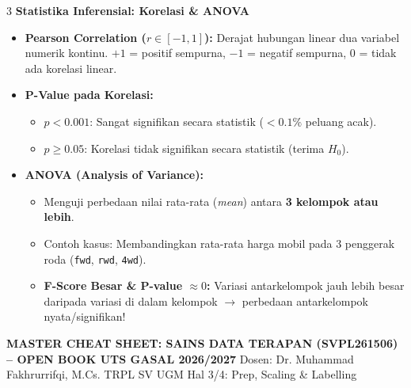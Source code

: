 \documentclass[6.8pt,landscape,a4paper]{extarticle}
\newcommand{\sdtSub}[1]{%
    \vspace{0.5pt}%
    \noindent\textbf{\fontsize{5.8pt}{6.8pt}\selectfont\color{sdtBlue}#1}\vspace{0.1pt}%
}
\begin{document}
\begin{multicols}{3}
\sdtSub{Statistika Inferensial: Korelasi \& ANOVA}
\begin{itemize}
    \item \textbf{Pearson Correlation ($r \in [-1, 1]$):} Derajat hubungan linear dua variabel numerik kontinu. $+1$ = positif sempurna, $-1$ = negatif sempurna, $0$ = tidak ada korelasi linear.
    \item \textbf{P-Value pada Korelasi:}
    \begin{itemize}
        \item $p < 0.001$: Sangat signifikan secara statistik ($< 0.1\%$ peluang acak).
        \item $p \geq 0.05$: Korelasi tidak signifikan secara statistik (terima $H_0$).
    \end{itemize}
    \item \textbf{ANOVA (Analysis of Variance):}
    \begin{itemize}
        \item Menguji perbedaan nilai rata-rata (\textit{mean}) antara \textbf{3 kelompok atau lebih}.
        \item Contoh kasus: Membandingkan rata-rata harga mobil pada 3 penggerak roda (\texttt{fwd}, \texttt{rwd}, \texttt{4wd}).
        \item \textbf{F-Score Besar \& P-value $\approx 0$:} Variasi antarkelompok jauh lebih besar daripada variasi di dalam kelompok $\rightarrow$ perbedaan antarkelompok nyata/signifikan!
    \end{itemize}
\end{itemize}

\end{multicols}

\clearpage

\noindent\colorbox{sdtNavy}{%
    \parbox{\dimexpr\textwidth-2\fboxsep\relax}{%
        \color{white}%
        \textbf{\fontsize{7.8pt}{8.8pt}\selectfont MASTER CHEAT SHEET: SAINS DATA TERAPAN (SVPL261506) -- OPEN BOOK UTS GASAL 2026/2027}%
        \hfill%
        \fontsize{5.8pt}{6.8pt}\selectfont Dosen: Dr. Muhammad Fakhrurrifqi, M.Cs. \textbar{} TRPL SV UGM \textbar{} Hal 3/4: Prep, Scaling \& Labelling%
    }%
}
\vspace{0.2mm}
\end{document}
